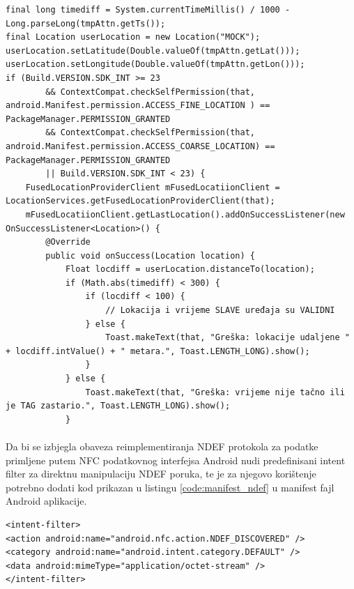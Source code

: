 \begin{code}
\begin{verbatim}
final long timediff = System.currentTimeMillis() / 1000 - Long.parseLong(tmpAttn.getTs());
final Location userLocation = new Location("MOCK");
userLocation.setLatitude(Double.valueOf(tmpAttn.getLat()));
userLocation.setLongitude(Double.valueOf(tmpAttn.getLon()));
if (Build.VERSION.SDK_INT >= 23
        && ContextCompat.checkSelfPermission(that, android.Manifest.permission.ACCESS_FINE_LOCATION ) == PackageManager.PERMISSION_GRANTED
        && ContextCompat.checkSelfPermission(that, android.Manifest.permission.ACCESS_COARSE_LOCATION) == PackageManager.PERMISSION_GRANTED
        || Build.VERSION.SDK_INT < 23) {
    FusedLocationProviderClient mFusedLocatiionClient = LocationServices.getFusedLocationProviderClient(that);
    mFusedLocatiionClient.getLastLocation().addOnSuccessListener(new OnSuccessListener<Location>() {
        @Override
        public void onSuccess(Location location) {
            Float locdiff = userLocation.distanceTo(location);
            if (Math.abs(timediff) < 300) {
                if (locdiff < 100) {
                    // Lokacija i vrijeme SLAVE uređaja su VALIDNI
                } else {
                    Toast.makeText(that, "Greška: lokacije udaljene " + locdiff.intValue() + " metara.", Toast.LENGTH_LONG).show();
                }
            } else {
                Toast.makeText(that, "Greška: vrijeme nije tačno ili je TAG zastario.", Toast.LENGTH_LONG).show();
            }
\end{verbatim}
\label{code:aa_validation}
\end{code}

\paragraph*{}
Da bi se izbjegla obaveza reimplementiranja NDEF protokola za podatke primljene putem NFC podatkovnog interfejsa Android nudi predefinisani intent filter za direktnu manipulaciju NDEF poruka, te je za njegovo korištenje potrebno dodati kod prikazan u listingu \ref{code:manifest_ndef} u manifest fajl Android aplikacije.

\begin{code}
\begin{verbatim}
<intent-filter>
<action android:name="android.nfc.action.NDEF_DISCOVERED" />
<category android:name="android.intent.category.DEFAULT" />
<data android:mimeType="application/octet-stream" />
</intent-filter>
\end{verbatim}
\label{code:manifest_ndef}
\end{code}

